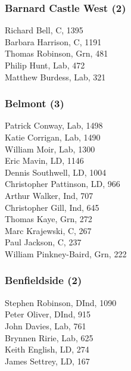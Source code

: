 \documentclass[a4paper,openany,10pt]{book}
\begin{document}
\subsubsection*{Barnard Castle West (2)}



Richard Bell, C, 1395\\
Barbara Harrison, C, 1191\\
Thomas Robinson, Grn, 481\\
Philip Hunt, Lab, 472\\
Matthew Burdess, Lab, 321\\


\subsubsection*{Belmont (3)}



Patrick Conway, Lab, 1498\\
Katie Corrigan, Lab, 1490\\
William Moir, Lab, 1300\\
Eric Mavin, LD, 1146\\
Dennis Southwell, LD, 1004\\
Christopher Pattinson, LD, 966\\
Arthur Walker, Ind, 707\\
Christopher Gill, Ind, 645\\
Thomas Kaye, Grn, 272\\
Marc Krajewski, C, 267\\
Paul Jackson, C, 237\\
William Pinkney-Baird, Grn, 222\\


\subsubsection*{Benfieldside (2)}



Stephen Robinson, DInd, 1090\\
Peter Oliver, DInd, 915\\
John Davies, Lab, 761\\
Brynnen Ririe, Lab, 625\\
Keith English, LD, 274\\
James Settrey, LD, 167\\
\end{document}
